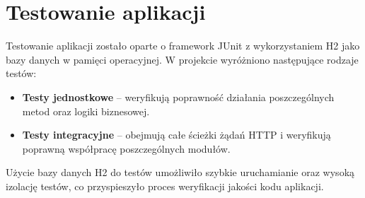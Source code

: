 \section{Testowanie aplikacji}

Testowanie aplikacji zostało oparte o framework JUnit z wykorzystaniem H2 jako bazy danych w pamięci operacyjnej. W projekcie wyróżniono następujące rodzaje testów:

\begin{itemize}
    \item \textbf{Testy jednostkowe} – weryfikują poprawność działania poszczególnych metod oraz logiki biznesowej.
    \item \textbf{Testy integracyjne} – obejmują całe ścieżki żądań HTTP i weryfikują poprawną współpracę poszczególnych modułów.
\end{itemize}

Użycie bazy danych H2 do testów umożliwiło szybkie uruchamianie oraz wysoką izolację testów, co przyspieszyło proces weryfikacji jakości kodu aplikacji.

